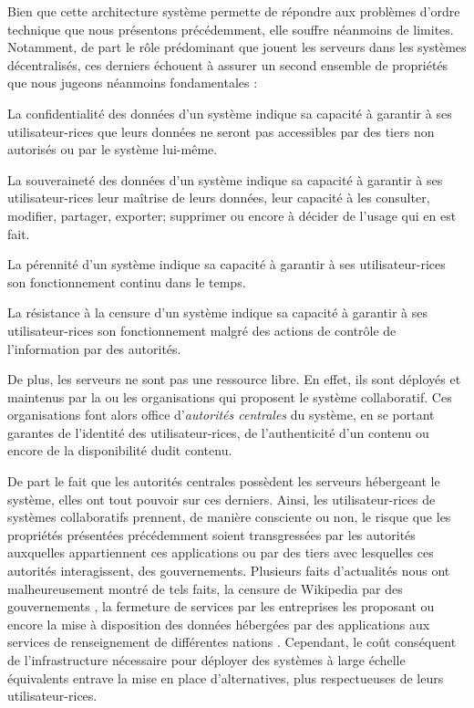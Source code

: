Bien que cette architecture système permette de répondre aux problèmes d'ordre technique que nous présentons précédemment, elle souffre néanmoins de limites.
Notamment, de part le rôle prédominant que jouent les serveurs dans les systèmes décentralisés, ces derniers échouent à assurer un second ensemble de propriétés que nous jugeons néanmoins fondamentales :
\begin{definition}
  \label{def:confidentialite}
  La confidentialité des données d'un système indique sa capacité à garantir à ses utilisateur-rices que leurs données ne seront pas accessibles par des tiers non autorisés ou par le système lui-même.
\end{definition}
\begin{definition}
  \label{def:souverainete}
  La souveraineté des données d'un système indique sa capacité à garantir à ses utilisateur-rices leur maîtrise de leurs données, \ie leur capacité à les consulter, modifier, partager, exporter; supprimer ou encore à décider de l'usage qui en est fait.
\end{definition}
\begin{definition}[Pérennité]
  \label{def:perennite}
  La pérennité d'un système indique sa capacité à garantir à ses utilisateur-rices son fonctionnement continu dans le temps.
\end{definition}
\begin{definition}
  \label{def:censorship}
  La résistance à la censure d'un système indique sa capacité à garantir à ses utilisateur-rices son fonctionnement malgré des actions de contrôle de l'information par des autorités.
\end{definition}

De plus, les serveurs ne sont pas une ressource libre.
En effet, ils sont déployés et maintenus par la ou les organisations qui proposent le système collaboratif.
Ces organisations font alors office d'\emph{autorités centrales} du système, \eg en se portant garantes de l'identité des utilisateur-rices, de l'authenticité d'un contenu ou encore de la disponibilité dudit contenu.

De part le fait que les autorités centrales possèdent les serveurs hébergeant le système, elles ont tout pouvoir sur ces derniers.
Ainsi, les utilisateur-rices de systèmes collaboratifs prennent, de manière consciente ou non, le risque que les propriétés présentées précédemment soient transgressées par les autorités auxquelles appartiennent ces applications ou par des tiers avec lesquelles ces autorités interagissent, \eg des gouvernements.
Plusieurs faits d'actualités nous ont malheureusement montré de tels faits, \eg la censure de Wikipedia par des gouvernements \cite{2022-wikipedia-censorship}, la fermeture de services par les entreprises les proposant \cite{2022-killed-by-google} ou encore la mise à disposition des données hébergées par des applications aux services de renseignement de différentes nations \cite{prism-guardian,prism-washington-post}.
Cependant, le coût conséquent de l'infrastructure nécessaire pour déployer des systèmes à large échelle équivalents entrave la mise en place d'alternatives, plus respectueuses de leurs utilisateur-rices.\\

